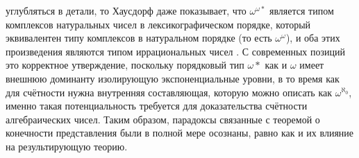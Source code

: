 \documentclass[12pt]{article}
\begin{document}
углубляться в детали, то Хаусдорф даже показывает, что $\omega^{\omega*}$ является типом комплексов натуральных чисел в лексикографическом порядке, который эквивалентен типу комплексов в натуральном порядке (то есть $\omega^{\omega}$), и оба этих произведения являются типом иррациональных чисел \cite{hausdorff-uncountable-product}. С современных позиций это корректное утверждение, поскольку порядковый тип $\omega*$ как и $\omega$ имеет внешнюю доминанту изолирующую экспоненциальные уровни, в то время как для счётности нужна внутренняя составляющая, которую можно описать как $\omega^{\aleph_0}$, именно такая потенциальность требуется для доказательства счётности алгебраических чисел. Таким образом, парадоксы связанные с теоремой о конечности представления были в полной мере осознаны, равно как и их влияние на результирующую теорию. 
\end{document}
